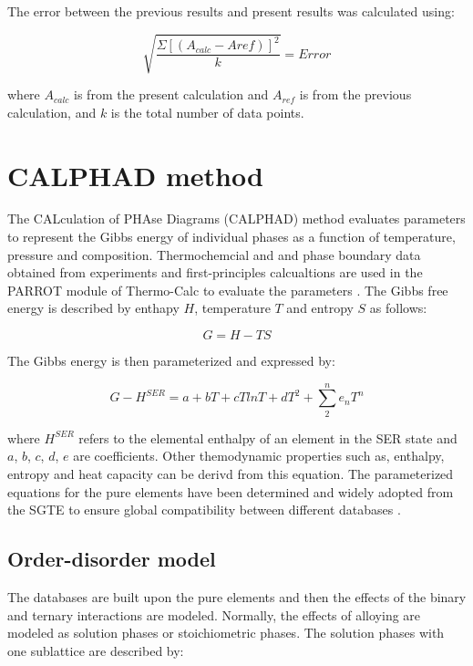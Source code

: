 The error between the previous results and present results was calculated using:

\begin{equation}
\label{eq: error}
\sqrt{\frac{\Sigma[(A_{calc}-A{ref})]^{2}}{k}} = Error
\end{equation}

where $A_{calc}$ is from the present calculation and $A_{ref}$ is from the previous calculation, and $k$ is the total number of data points. 

\section{CALPHAD method}

The CALculation of PHAse Diagrams (CALPHAD) method evaluates parameters to represent the Gibbs energy of individual phases as a function of temperature, pressure and composition. Thermochemcial and and phase boundary data obtained from experiments and first-principles calcualtions are used in the PARROT module of Thermo-Calc to evaluate the parameters \cite{Andersson2002}. The Gibbs free energy is described by enthapy $H$, temperature $T$ and entropy $S$ as follows:

\begin{equation}
\label{eq: gibbs}
G = H - T S 
\end{equation}

The Gibbs energy is then parameterized and expressed by:

\begin{equation}
\label{eq: parameterizaiton}
G - H^{SER} = a + bT + cT ln T + d T^2 + \sum_{2}^{n} e_{n} T^{n}
\end{equation}

where $H^{SER}$ refers to the elemental enthalpy of an element in the SER state and $a$, $b$, $c$, $d$, $e$ are coefficients. Other themodynamic properties such as, enthalpy, entropy and heat capacity can be derivd from this equation. The parameterized equations for the pure elements have been determined and widely adopted from the SGTE to ensure global compatibility between different databases \cite{Dinsdale1991}. 

\subsection{Order-disorder model}

The databases are built upon the pure elements and then the effects of the binary and ternary interactions are modeled. Normally, the effects of alloying are modeled as solution phases or stoichiometric phases. The solution phases with one sublattice are described by: 

